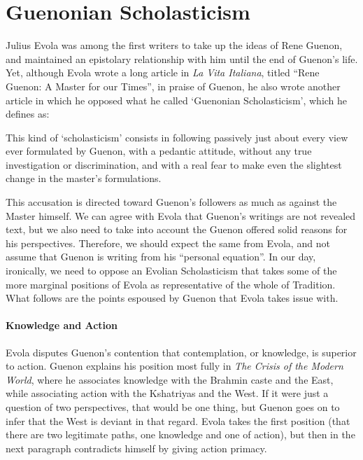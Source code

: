 \section{Guenonian Scholasticism}

Julius Evola was among the first writers to take up the ideas of Rene Guenon, and maintained an epistolary relationship with him until the end of Guenon's life. Yet, although Evola wrote a long article in \emph{La Vita Italiana}, titled ``Rene Guenon: A Master for our Times'', in praise of Guenon, he also wrote another article in which he opposed what he called `Guenonian Scholasticism', which he defines as:

\begin{quotex}
This kind of `scholasticism' consists in following passively just about every view ever formulated by Guenon, with a pedantic attitude, without any true investigation or discrimination, and with a real fear to make even the slightest change in the master's formulations.
\end{quotex}


This accusation is directed toward Guenon's followers as much as against the Master himself. We can agree with Evola that Guenon's writings are not revealed text, but we also need to take into account the Guenon offered solid reasons for his perspectives. Therefore, we should expect the same from Evola, and not assume that Guenon is writing from his ``personal equation''. In our day, ironically, we need to oppose an Evolian Scholasticism that takes some of the more marginal positions of Evola as representative of the whole of Tradition. What follows are the points espoused by Guenon that Evola takes issue with.


\paragraph{Knowledge and Action}


Evola disputes Guenon's contention that contemplation, or knowledge, is superior to action. Guenon explains his position most fully in \emph{The Crisis of the Modern World}, where he associates knowledge with the Brahmin caste and the East, while associating action with the Kshatriyas and the West. If it were just a question of two perspectives, that would be one thing, but Guenon goes on to infer that the West is deviant in that regard. Evola takes the first position (that there are two legitimate paths, one knowledge and one of action), but then in the next paragraph contradicts himself by giving action primacy.

